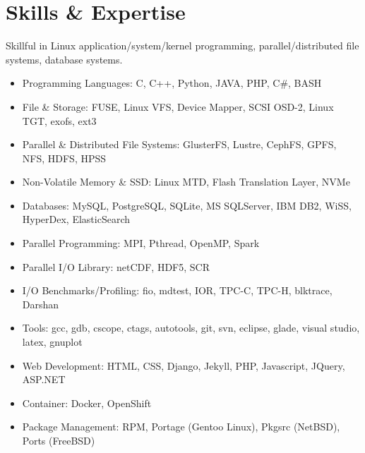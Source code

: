\section{Skills \& Expertise}
Skillful in Linux application/system/kernel programming, parallel/distributed
file systems, database systems.
\begin{itemize}
\item {Programming Languages}: C, C++, Python, JAVA, PHP, C\#, BASH
\item {File \& Storage}: FUSE, Linux VFS, Device Mapper, SCSI OSD-2, Linux TGT, exofs, ext3
\item {Parallel \& Distributed File Systems}: GlusterFS, Lustre, CephFS, GPFS, NFS, HDFS, HPSS
\item {Non-Volatile Memory \& SSD}: Linux MTD, Flash Translation Layer, NVMe
\item {Databases}: MySQL, PostgreSQL, SQLite, MS SQLServer, IBM DB2, WiSS, HyperDex, ElasticSearch
\item {Parallel Programming}: MPI, Pthread, OpenMP, Spark
\item {Parallel I/O Library}: netCDF, HDF5, SCR
\item {I/O Benchmarks/Profiling}: fio, mdtest, IOR, TPC-C, TPC-H, blktrace, Darshan
\item {Tools}: gcc, gdb, cscope, ctags, autotools, git, svn, eclipse, glade, visual studio, latex, gnuplot
\item {Web Development}: HTML, CSS, Django, Jekyll, PHP, Javascript, JQuery, ASP.NET
\item {Container}: Docker, OpenShift
\item {Package Management}: RPM, Portage (Gentoo Linux), Pkgsrc (NetBSD), Ports (FreeBSD)
\end{itemize}

